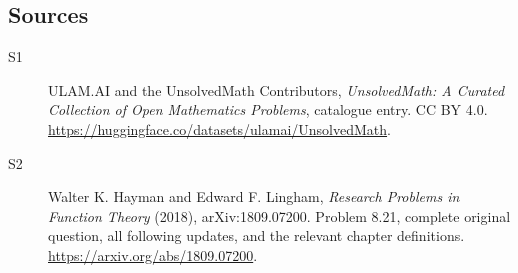 \documentclass[11pt]{book}
\begin{document}
\subsection{Sources}
\begin{description}
\item[\hypertarget{source:statement:1}{S1}] ULAM.AI and the UnsolvedMath Contributors, \emph{UnsolvedMath: A Curated Collection of Open Mathematics Problems}, catalogue entry. CC BY 4.0. \url{https://huggingface.co/datasets/ulamai/UnsolvedMath}.
\item[\hypertarget{source:statement:2}{S2}] Walter K. Hayman and Edward F. Lingham, \emph{Research Problems in Function Theory} (2018), arXiv:1809.07200. Problem 8.21, complete original question, all following updates, and the relevant chapter definitions. \url{https://arxiv.org/abs/1809.07200}.
\end{description}
\label{end:statement}
\end{document}
